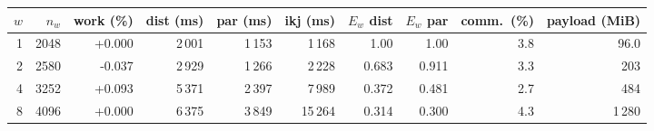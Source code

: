 \begin{tabular}{rrrrrrrrrr}
\toprule
$w$ & $n_w$ & work (\%) & dist (ms) & par (ms) & ikj (ms) & $E_w$ dist & $E_w$ par & comm.\ (\%) & payload (MiB) \\
\midrule
1 & 2048 & +0.000 & 2\,001 & 1\,153 & 1\,168 & 1.00 & 1.00 & 3.8 & 96.0 \\
2 & 2580 & -0.037 & 2\,929 & 1\,266 & 2\,228 & 0.683 & 0.911 & 3.3 & 203 \\
4 & 3252 & +0.093 & 5\,371 & 2\,397 & 7\,989 & 0.372 & 0.481 & 2.7 & 484 \\
8 & 4096 & +0.000 & 6\,375 & 3\,849 & 15\,264 & 0.314 & 0.300 & 4.3 & 1\,280 \\
\bottomrule
\end{tabular}
\par{}
